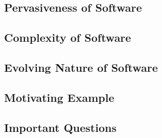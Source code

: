 
\subsection{Pervasiveness of Software}



\subsection{Complexity of Software}



\subsection{Evolving Nature of Software}



\subsection{Motivating Example}





\subsection{Important Questions}



